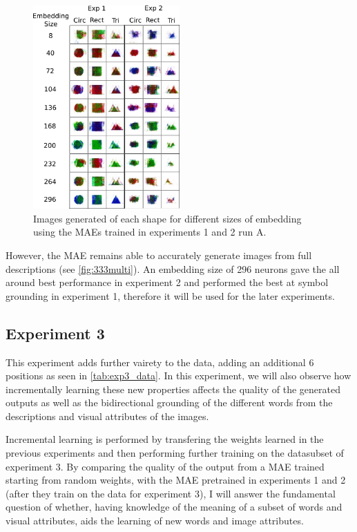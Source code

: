 \begin{figure}[h]
\centering
\includegraphics[width=0.5\textwidth]{Figs/shapes/shapes331v333.png}
\caption{Images generated of each shape for different sizes of embedding using the \acp{MAE} trained in experiments 1 and 2 run A.}
\label{fig:shapes333v331}
\end{figure} %
However, the \ac{MAE} remains able to accurately generate images from full descriptions (see \autoref{fig:333multi}). 
An embedding size of 296 neurons gave the all around best performance in experiment 2 and performed the best at symbol grounding in experiment 1, therefore it will be used for the later experiments.

\newpage
\subsection{Experiment 3}
This experiment adds further vairety to the data, adding an additional 6 positions as seen in \autoref{tab:exp3_data}. In this experiment, we will also observe how incrementally learning these new properties affects the quality of the generated outputs as well as the bidirectional grounding of the different words from the descriptions and visual attributes of the images. 

Incremental learning is performed by transfering the weights learned in the previous experiments and then performing further training on the datasubset of experiment 3. By comparing the quality of the output from a \ac{MAE} trained starting from random weights, with the \ac{MAE} pretrained in experiments 1 and 2 (after they train on the data for experiment 3), I will answer the fundamental question of whether, having knowledge of the meaning of a subset of words and visual attributes, aids the learning of new words and image attributes.

